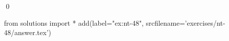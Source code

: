 
\begin{ex} 
  \label{ex:nt-48}
  
  \qed
\end{ex} 
\begin{python0}
from solutions import *
add(label="ex:nt-48",
    srcfilename='exercises/nt-48/answer.tex') 
\end{python0}
